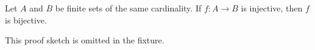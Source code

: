 \documentclass[12pt]{article}
\begin{document}
\begin{lemma}
Let $A$ and $B$ be finite sets of the same cardinality. If $f : A \to B$ is injective, then $f$ is bijective.
\end{lemma}

This proof sketch is omitted in the fixture.
\end{document}
